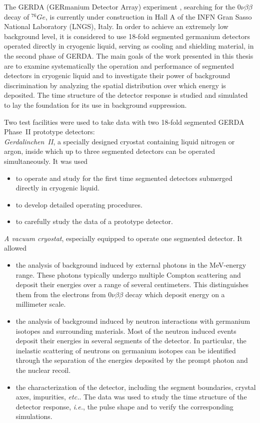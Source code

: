 The GERDA (GERmanium Detector Array) experiment \cite{Abt04, Sch05},
searching for the $0\nu\beta\beta$ decay of $^{76}Ge$, is currently
under construction in Hall A of the INFN Gran Sasso National
Laboratory (LNGS), Italy. In order to achieve an extremely low
background level, it is considered to use 18-fold segmented germanium
detectors operated directly in cryogenic liquid, serving as cooling
and shielding material, in the second phase of GERDA. The main goals
of the work presented in this thesis are to examine systematically the
operation and performance of segmented detectors in cryogenic liquid
and to investigate their power of background discrimination by
analyzing the spatial distribution over which energy is deposited. The
time structure of the detector response is studied and simulated to
lay the foundation for its use in background suppression.

Two test facilities were used to take data with two 18-fold segmented
GERDA Phase~II prototype detectors:\\
\emph{Gerdalinchen~II}, a specially designed cryostat containing
liquid nitrogen or argon, inside which up to three segmented detectors
can be operated simultaneously. It was used
\begin{itemize}
\item to operate and study for the first time segmented detectors
submerged directly in cryogenic liquid.
\item to develop detailed operating procedures.
\item to carefully study the data of a prototype detector.
\end{itemize}
\emph{A vacuum cryostat}, especially equipped to operate one segmented
detector. It allowed
\begin{itemize}
\item the analysis of background induced by external photons in the
MeV-energy range. These photons typically undergo multiple Compton
scattering and deposit their energies over a range of several
centimeters. This distinguishes them from the electrons from
$0\nu\beta\beta$ decay which deposit energy on a millimeter scale.
\item the analysis of background induced by neutron interactions with
germanium isotopes and surrounding materials. Most of the neutron
induced events deposit their energies in several segments of the
detector. In particular, the inelastic scattering of neutrons on
germanium isotopes can be identified through the separation of the
energies deposited by the prompt photon and the nuclear recoil.
\item the characterization of the detector, including the segment
boundaries, crystal axes, impurities, \textit{etc.}. The data was used
to study the time structure of the detector response, \textit{i.e.},
the pulse shape and to verify the corresponding simulations.
\end{itemize}

